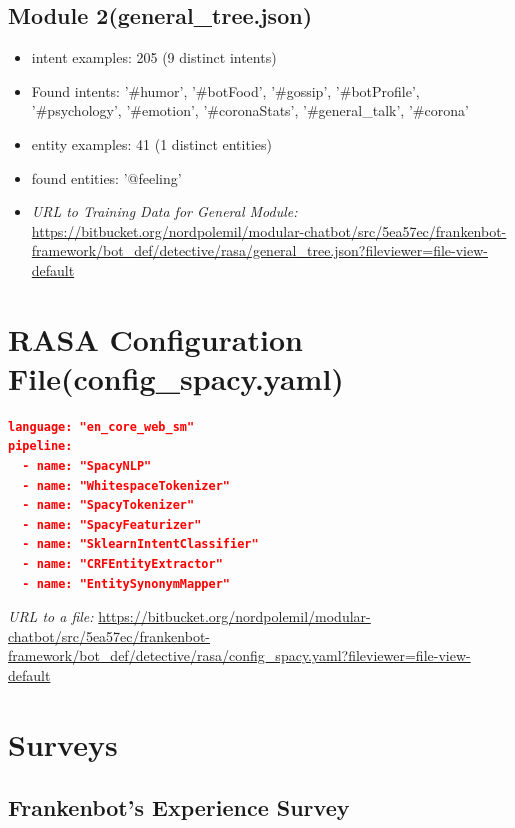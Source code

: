 \begin{appendix}
\subsection{Module 2(general\_tree.json)\label{appen:generalJson}}
\begin{itemize}
    \item intent examples: 205 (9 distinct intents)
	\item Found intents: '\#humor', '\#botFood', '\#gossip', '\#botProfile', '\#psychology', '\#emotion', '\#coronaStats', '\#general\_talk', '\#corona'
	\item entity examples: 41 (1 distinct entities)
	\item found entities: '@feeling'
	\item \textit{URL to Training Data for General Module: }\url{https://bitbucket.org/nordpolemil/modular-chatbot/src/5ea57ec/frankenbot-framework/bot_def/detective/rasa/general\_tree.json?fileviewer=file-view-default}
\end{itemize}
    

\section{RASA Configuration File(config\_spacy.yaml)\label{appen:rasaConf}}
\begin{lstlisting}[language=json, firstnumber=1]
language: "en_core_web_sm"
pipeline:
  - name: "SpacyNLP"
  - name: "WhitespaceTokenizer"
  - name: "SpacyTokenizer"
  - name: "SpacyFeaturizer"
  - name: "SklearnIntentClassifier"
  - name: "CRFEntityExtractor"
  - name: "EntitySynonymMapper"
\end{lstlisting}
\textit{URL to a file: }\url{https://bitbucket.org/nordpolemil/modular-chatbot/src/5ea57ec/frankenbot-framework/bot_def/detective/rasa/config\_spacy.yaml?fileviewer=file-view-default}

\section{Surveys\label{appen:survey}}

\subsection{Frankenbot's Experience Survey\label{appen:expsurvey}}



\end{appendix}
